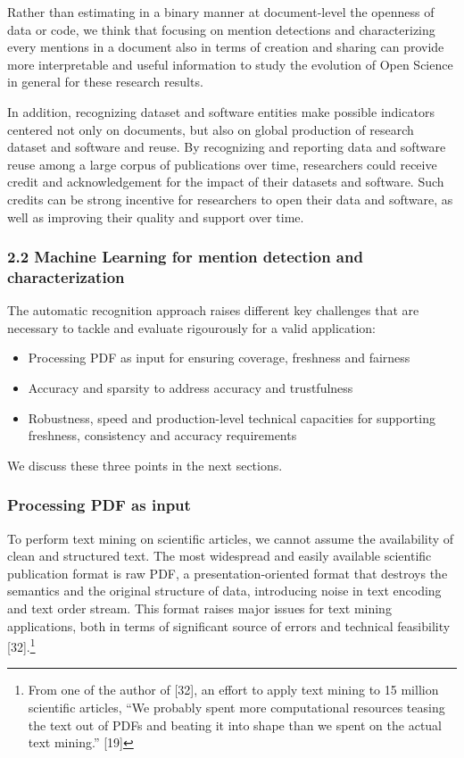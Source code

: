 \documentclass[
]{article}
\providecommand{\tightlist}{%
  \setlength{\itemsep}{0pt}\setlength{\parskip}{0pt}}
\begin{document}
Rather than estimating in a binary manner at document-level the openness
of data or code, we think that focusing on mention detections and
characterizing every mentions in a document also in terms of creation
and sharing can provide more interpretable and useful information to
study the evolution of Open Science in general for these research
results.

In addition, recognizing dataset and software entities make possible
indicators centered not only on documents, but also on global production
of research dataset and software and reuse. By recognizing and reporting
data and software reuse among a large corpus of publications over time,
researchers could receive credit and acknowledgement for the impact of
their datasets and software. Such credits can be strong incentive for
researchers to open their data and software, as well as improving their
quality and support over time.

\hypertarget{machine-learning-for-mention-detection-and-characterization-1}{%
\subsubsection{2.2 Machine Learning for mention detection and
characterization}\label{machine-learning-for-mention-detection-and-characterization-1}}

The automatic recognition approach raises different key challenges that
are necessary to tackle and evaluate rigourously for a valid
application:

\begin{itemize}
\tightlist
\item
  Processing PDF as input for ensuring coverage, freshness and fairness
\item
  Accuracy and sparsity to address accuracy and trustfulness
\item
  Robustness, speed and production-level technical capacities for
  supporting freshness, consistency and accuracy requirements
\end{itemize}

We discuss these three points in the next sections.

\hypertarget{processing-pdf-as-input}{%
\subsubsection{Processing PDF as input}\label{processing-pdf-as-input}}

To perform text mining on scientific articles, we cannot assume the
availability of clean and structured text. The most widespread and
easily available scientific publication format is raw PDF, a
presentation-oriented format that destroys the semantics and the
original structure of data, introducing noise in text encoding and text
order stream. This format raises major issues for text mining
applications, both in terms of significant source of errors and
technical feasibility {[}32{]}.\footnote{From one of the author of
  {[}32{]}, an effort to apply text mining to 15 million scientific
  articles, ``We probably spent more computational resources teasing the
  text out of PDFs and beating it into shape than we spent on the actual
  text mining.'' {[}19{]}}
\end{document}
